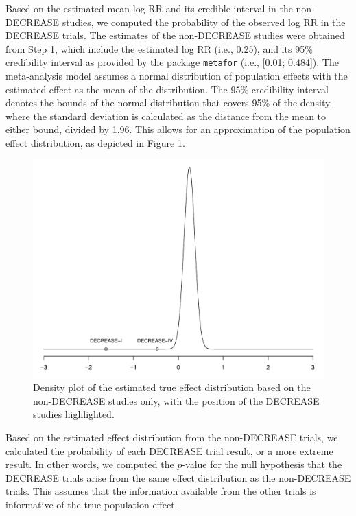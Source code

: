 \documentclass[]{article}
\begin{document}
Based on the estimated mean log RR and its credible interval in the
non-DECREASE studies, we computed the probability of the observed log RR
in the DECREASE trials. The estimates of the non-DECREASE studies were
obtained from Step 1, which include the estimated log RR (i.e., 0.25),
and its 95\% credibility interval as provided by the package
\texttt{metafor} (i.e., {[}0.01; 0.484{]}). The meta-analysis model
assumes a normal distribution of population effects with the estimated
effect as the mean of the distribution. The 95\% credibility interval
denotes the bounds of the normal distribution that covers 95\% of the
density, where the standard deviation is calculated as the distance from
the mean to either bound, divided by 1.96. This allows for an
approximation of the population effect distribution, as depicted in
Figure 1.

\begin{figure}

{\centering \includegraphics[width=0.8\linewidth]{../figures/fig1} 

}

\caption{Density plot of the estimated true effect distribution based on the non-DECREASE studies only, with the position of the DECREASE studies highlighted.}\label{fig:figure 1}
\end{figure}

Based on the estimated effect distribution from the non-DECREASE trials,
we calculated the probability of each DECREASE trial result, or a more
extreme result. In other words, we computed the \(p\)-value for the null
hypothesis that the DECREASE trials arise from the same effect
distribution as the non-DECREASE trials. This assumes that the
information available from the other trials is informative of the true
population effect.
\end{document}
